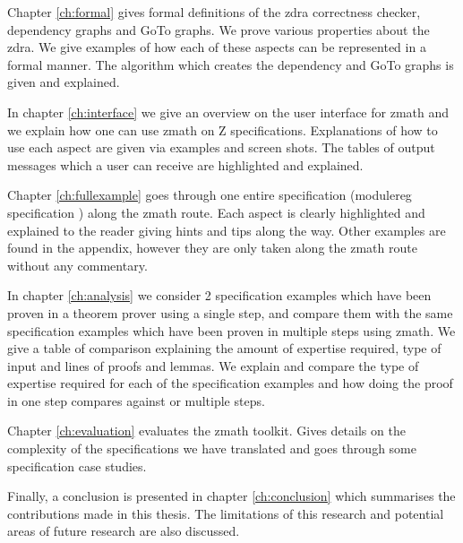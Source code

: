 Chapter \ref{ch:formal} gives formal definitions of the \gls{zdra} correctness
checker, dependency graphs and GoTo graphs. We prove various properties about
the \gls{zdra}. We give examples of how each of these aspects can be represented
in a formal manner. The algorithm which creates the dependency and GoTo graphs
is given and explained.

In chapter \ref{ch:interface} we give an overview on the user interface for
\gls{zmath} and we explain how one can use \gls{zmath} on Z specifications.
Explanations of how to use each aspect are given via examples and screen shots.
The tables of output messages which a user can receive are highlighted and
explained.

Chapter \ref{ch:fullexample} goes through one entire specification (modulereg
specification \cite{essenceofz}) along the \gls{zmath} route. Each aspect is
clearly highlighted and explained to the reader giving hints and tips along the
way. Other examples are found in the appendix, however they are only taken along
the \gls{zmath} route without any commentary.

In chapter \ref{ch:analysis} we consider 2 specification examples which have
been proven in a theorem prover using a single step, and compare them with the
same specification examples which have been proven in multiple steps using
\gls{zmath}. We give a table of comparison explaining the amount of expertise
required, type of input and lines of proofs and lemmas. We explain and compare
the type of expertise required for each of the specification examples and how
doing the proof in one step compares against or multiple steps.

Chapter \ref{ch:evaluation} evaluates the \gls{zmath} toolkit. Gives details on
the complexity of the specifications we have translated and goes through some
specification case studies.

Finally, a conclusion is presented in chapter \ref{ch:conclusion} which
summarises the contributions made in this thesis. The limitations of this
research and potential areas of future research are also discussed.
